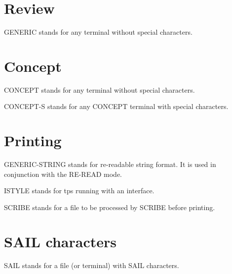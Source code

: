 \section{Review}

\begin{description} 
\item[GENERIC]  
GENERIC stands for any terminal without special characters.
\item
\end{description}

\section{Concept}

\begin{description} 
\item[CONCEPT]  
CONCEPT stands for any terminal without special characters.

\item[CONCEPT-S]  
CONCEPT-S stands for any CONCEPT terminal with special characters.
\item
\end{description}

\section{Printing}

\begin{description} 
\item[GENERIC-STRING]  
GENERIC-STRING stands for re-readable string format.
It is used in conjunction with the RE-READ mode.

\item[ISTYLE]  
ISTYLE stands for tps running with an interface.

\item[SCRIBE]  
SCRIBE stands for a file to be processed by SCRIBE before printing.
\item
\end{description}

\section{SAIL characters}

\begin{description} 
\item[SAIL]  
SAIL stands for a file (or terminal) with SAIL characters.
\item
\end{description}

